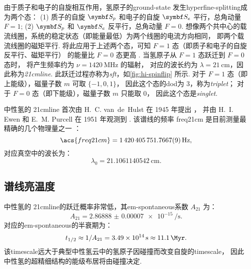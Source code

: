 由于质子和电子的自旋相互作用，氢原子的\ac{ground-state}
发生\ac{hyperfine-splitting}成为两个态：
(1) 质子的自旋 $\B{S}_p$ 和电子的自旋 $\B{S}_e$ 平行，总角动量 $F = 1$;
(2) $\B{S}_p$ 和 $\B{S}_e$ 反平行，总角动量 $F = 0$.
想像两个共中心的载流线圈，系统的稳定状态（即能量最低）为两个线圈的电流方向相同，
即两个载流线圈的磁矩平行.
将此应用于上述两个态，可知 $F = 1$ 态（即质子和电子的自旋反平行、磁矩平行）
的能量比 $F = 0$ 态更高 \cite{griffiths1982}.
当氢原子从 $F = 1$ 态跃迁到 $F = 0$ 态时，
将产生频率约为 $\nu = \SI{1420}{\MHz}$ 的辐射，
对应的波长约为 $\lambda = \SI{21}{\cm}$，因此称为\emph{\acf{21cmline}}.
此跃迁过程亦称为\emph{\acf{sft}}，如\autoref{fig:hi-spinflip} 所示.
对于 $F = 1$ 态（即上能级），磁量子数 $m$ 可取 $\{ -1, 0, 1 \}$，
因此这个态的\ac{dod}为 3，称为\emph{\acf{triplet}}；
对于 $F = 0$ 态（即下能级），磁量子数 $m$ 只能取 0，
因此这个态是\emph{\acf{singlet}}.

中性氢的 \ac{21cmline}%
首次由 H.~C. van~de~Hulst 在 1945 年提出 \cite{vanDeHulst1945}，
并由 H.~I. Ewen 和 E.~M. Purcell 在 1951 年观测到 \cite{ewen1951}.
该谱线的频率 \ac{freq21cm} 是目前测量最精确的几个物理量之一
\cite{hellwig1970,essen1971}：
\begin{equation}
  \label{eq:hi-line-frequency}
  \acs{freq21cm} = \SI{1420405751.7667 +- 0.0009}{\Hz} ,
\end{equation}
对应真空中的波长为：
\begin{equation}
  \label{eq:hi-line-wavelength}
  \lambda_0 = \SI{21.1061140542}{\cm} .
\end{equation}

\subsection{谱线亮温度}

中性氢的 \ac{21cmline}的跃迁概率非常低，其\ac{em-spontaneous}系数 $A_{21}$ 为：
\begin{equation}
  A_{21} = \SI[separate-uncertainty=false]{2.86888(7)e-15}{\per\second} .
\end{equation}
对应的\ac{em-spontaneous}的半衰期为：
\begin{equation}
  t_{1/2} \approx 1 / A_{21}
    = \SI{3.49e14}{\second} \approx \SI{11.1}{\Myr} .
\end{equation}
该\ac{timescale}远大于典型中性氢云中的氢原子因碰撞而改变自旋的\ac{timescale}，
因此中性氢的超精细结构的能级布居将由碰撞决定.

